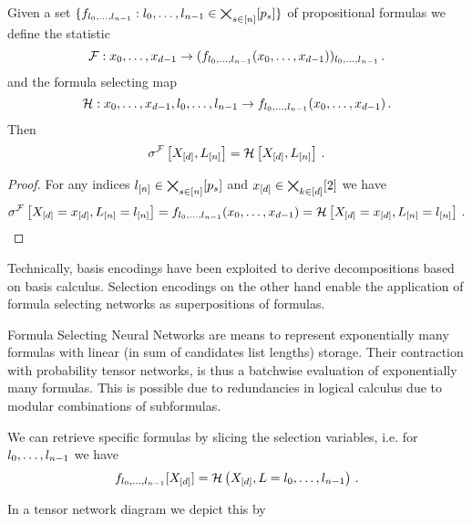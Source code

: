 \begin{lemma}
    \label{lem:relToSelFSN}
    Given a set $\{f_{l_{0},\ldots,l_{n-1}} : l_{0},\ldots,l_{n-1}\in\bigtimes_{s\in[n]}[p_{s}]\}$ of propositional formulas we define the statistic
    \[ \mathcal{F} : x_{0},\ldots,x_{d-1} \rightarrow (f_{l_{0},\ldots,l_{n-1}}(x_{0},\ldots,x_{d-1}))_{l_{0},\ldots,l_{n-1}} \, . \]
    and the formula selecting map
    \[ \mathcal{H}: x_{0},\ldots,x_{d-1} , l_{0},\ldots,l_{n-1} \rightarrow f_{l_{0},\ldots,l_{n-1}} (x_{0},\ldots,x_{d-1}) \, . \]
    Then
    \[ \sigma^{\mathcal{F}}\left[X_{[d]}, L_{[n]}\right] = \mathcal{H}\left[X_{[d]}, L_{[n]} \right] \, .  \]
\end{lemma}
\begin{proof}
    For any indices $l_{[n]}\in\bigtimes_{s\in[n]}[p_{s}]$ and $x_{[d]}\in\bigtimes_{k\in[d]}[2]$ we have
    \begin{align*}
        \sigma^{\mathcal{F}}\left[X_{[d]}=x_{[d]}, L_{[n]}=l_{[n]}\right]
        =  f_{l_{0},\ldots,l_{n-1}}(x_{0},\ldots,x_{d-1}) =  \mathcal{H}\left[X_{[d]}=x_{[d]}, L_{[n]}=l_{[n]} \right] \, .
    \end{align*}
\end{proof}

Technically, basis encodings have been exploited to derive decompositions based on basis calculus.
Selection encodings on the other hand enable the application of formula selecting networks as superpositions of formulas.




Formula Selecting Neural Networks are means to represent exponentially many formulas with linear (in sum of candidates list lengths) storage.
Their contraction with probability tensor networks, is thus a batchwise evaluation of exponentially many formulas.
This is possible due to redundancies in logical calculus due to modular combinations of subformulas.

We can retrieve specific formulas by slicing the selection variables, i.e. for $l_{0},\ldots,l_{n-1}$ we have
\[ f_{l_{0},\ldots,l_{n-1}}[X_{[d]}] = \mathcal{H}\left(X_{[d]},L=l_{0},\ldots,l_{n-1}\right) \, .  \]

In a tensor network diagram we depict this by
\begin{center}
    
\end{center}

